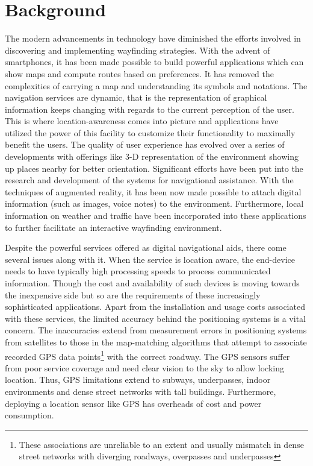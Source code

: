 \documentclass{iitkthesis}
\begin{document}
\section{Background}
The modern advancements in technology have diminished the efforts involved in discovering and implementing wayfinding strategies. With the advent of smartphones, it has been made possible to build powerful applications which can show maps and compute routes based on preferences. It has removed the complexities of carrying a map and understanding its symbols and notations. The navigation services are dynamic, that is the representation of graphical information keeps changing with regards to the current perception of the user. This is where location-awareness comes into picture and applications have utilized the power of this facility to customize their functionality to maximally benefit the users. The quality of user experience has evolved over a series of developments with offerings like 3-D representation of the environment showing up places nearby for better orientation. Significant efforts have been put into the research and development of the systems for navigational assistance. With the techniques of augmented reality, it has been now made possible to attach digital information (such as images, voice notes) to the environment. Furthermore, local information on weather and traffic have been incorporated into these applications to further facilitate an interactive wayfinding environment.

Despite the powerful services offered as digital navigational aids, there come several issues along with it. When the service is location aware, the end-device needs to have typically high processing speeds to process communicated information. Though the cost and availability of such devices is moving towards the inexpensive side but so are the requirements of these increasingly sophisticated applications. Apart from the installation and usage costs associated with these services, the limited accuracy behind the positioning systems is a vital concern. The inaccuracies extend from measurement errors in positioning systems from satellites to those in the map-matching algorithms \cite{white2000} that attempt to associate recorded GPS data points\footnote{These associations are unreliable to an extent and usually mismatch in dense street networks with diverging roadways, overpasses and underpasses} with the correct roadway. The GPS sensors suffer from poor service coverage and need clear vision to the sky to allow locking location. Thus, GPS limitations extend to subways, underpasses, indoor environments and dense street networks with tall buildings. Furthermore, deploying a location sensor like GPS has overheads of cost and power consumption.
\end{document}
